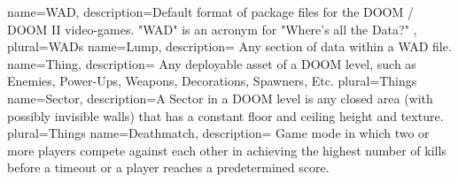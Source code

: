 {
  name=WAD,
  description={Default format of package files for the DOOM / DOOM II video-games. "WAD" is an acronym for "Where's all the Data?" \cite{wadmeaning} },  plural=WADs
}
{
	name=Lump,
	description={ Any section of data within a \gls{WAD} file. }
}
{
	name=Thing,
	description={ Any deployable asset of a DOOM level, such as Enemies, Power-Ups, Weapons, Decorations, Spawners, Etc. }
	plural=Things
}
{
	name=Sector,
	description={A Sector in a DOOM level is any closed area (with possibly invisible walls) that has a constant floor and ceiling height and texture.  }
	plural=Things
}
{
	name=Deathmatch,
	description={ Game mode in which two or more players compete against each other in achieving the highest number of kills before a timeout or a player reaches a predetermined score. }
}



